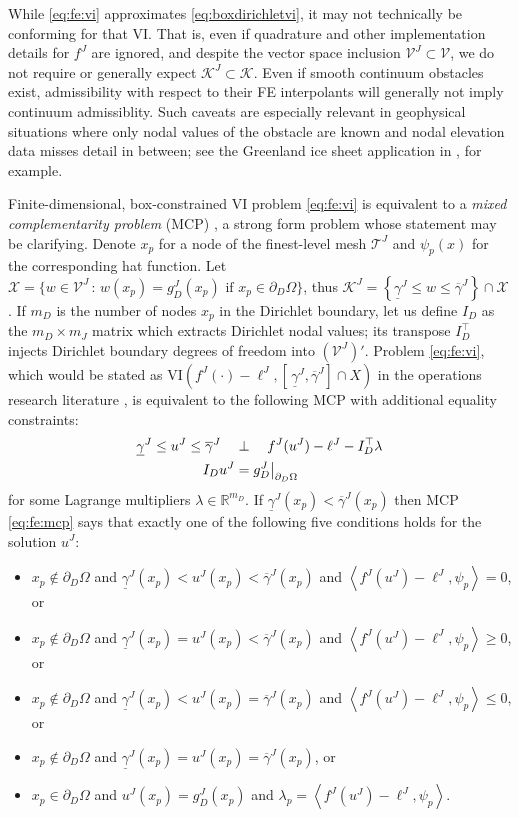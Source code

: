 \documentclass[letterpaper,final,12pt,reqno]{amsart}
\theoremstyle{cstyle}
\theoremstyle{cstyle*}
\theoremstyle{dstyle}
\numberwithin{equation}{section}
\numberwithin{figure}{section}
\numberwithin{table}{section}
\numberwithin{theorem}{section}
\newcommand{\RR}{\mathbb{R}}
\newcommand{\cK}{\mathcal{K}}
\newcommand{\cV}{\mathcal{V}}
\newcommand{\ip}[2]{\left<#1,#2\right>}
\begin{document}
While \eqref{eq:fe:vi} approximates \eqref{eq:boxdirichletvi}, it may not technically be conforming for that VI.  That is, even if quadrature and other implementation details for $f^J$ are ignored, and despite the vector space inclusion $\mathcal{V}^J \subset \mathcal{V}$, we do not require or generally expect $\mathcal{K}^J \subset \mathcal{K}$.  Even if smooth continuum obstacles exist, admissibility with respect to their FE interpolants will generally not imply continuum admissiblity.  Such caveats are especially relevant in geophysical situations where only nodal values of the obstacle are known and nodal elevation data misses detail in between; see the Greenland ice sheet application in \cite{Bueler2016}, for example.

Finite-dimensional, box-constrained VI problem \eqref{eq:fe:vi} is equivalent to a \emph{mixed complementarity problem} (MCP) \cite{FacchineiPang2003,FerrisPang1997}, a strong form problem whose statement may be clarifying.  Denote $x_p$ for a node of the finest-level mesh $\mathcal{T}^J$ and $\psi_p(x)$ for the corresponding hat function.  Let $\mathcal{X}=\big\{w\in\cV^J\,:\,w(x_p)=g_D^J(x_p) \text{ if } x_p\in \partial_D\Omega\big\}$, thus $\cK^J = \left\{\underline{\gamma}^J \le w \le \overline{\gamma}^J\right\} \cap \mathcal{X}$.  If $m_D$ is the number of nodes $x_p$ in the Dirichlet boundary, let us define $I_D$ as the $m_D\times m_J$ matrix which extracts Dirichlet nodal values; its transpose $I_D^\top$ injects Dirichlet boundary degrees of freedom into $(\mathcal{V}^J)'$.  Problem \eqref{eq:fe:vi}, which would be stated as VI$\left(f^J(\cdot)-\ell^J,\left[\,\underline{\gamma}^J,\overline{\gamma}^J\right] \cap X\right)$ in the operations research literature \cite{FerrisPang1997}, is equivalent to the following MCP with additional equality constraints:
\begin{align}
\underline{\gamma}^J \le u^J \le \overline{\gamma}^J \quad &\perp \quad f^J(u^J) - \ell^J - I_D^\top \lambda \label{eq:fe:mcp} \\
I_D u^J &= g_D^J\big|_{\partial_D\Omega} \notag
\end{align}
for some Lagrange multipliers $\lambda \in \RR^{m_D}$.  If $\underline{\gamma}^J(x_p) < \overline{\gamma}^J(x_p)$ then MCP \eqref{eq:fe:mcp} says that exactly one of the following five conditions holds for the solution $u^J$:
\begin{itemize}
\item $x_p \notin \partial_D\Omega$ and $\underline{\gamma}^J(x_p)<u^J(x_p)<\overline{\gamma}^J(x_p)$ and $\ip{f^J(u^J)-\ell^J}{\psi_p} = 0$, or
\item $x_p \notin \partial_D\Omega$ and $\underline{\gamma}^J(x_p)=u^J(x_p)<\overline{\gamma}^J(x_p)$ and $\ip{f^J(u^J)-\ell^J}{\psi_p} \ge 0$, or
\item $x_p \notin \partial_D\Omega$ and $\underline{\gamma}^J(x_p)<u^J(x_p)=\overline{\gamma}^J(x_p)$ and $\ip{f^J(u^J)-\ell^J}{\psi_p} \le 0$, or
\item $x_p \notin \partial_D\Omega$ and $\underline{\gamma}^J(x_p)=u^J(x_p)=\overline{\gamma}^J(x_p)$, or
\item $x_p \in \partial_D\Omega$ and $u^J(x_p)=g_D^J(x_p)$ and $\lambda_p=\ip{f^J(u^J)-\ell^J}{\psi_p}$.
\end{itemize}
\end{document}
